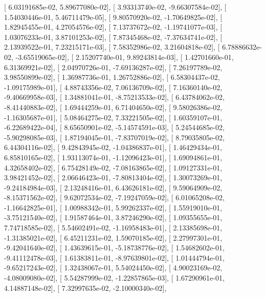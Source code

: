 \documentclass{article}
\begin{document}
       [  6.03191685e-02,   5.89677080e-02],
       [  3.93313740e-02,  -9.66307584e-02],
       [  1.54030446e-01,   5.46711479e-05],
       [  9.80570920e-02,  -1.70649825e-02],
       [  1.82945455e-01,   4.27054576e-02],
       [  7.13737672e-02,  -1.19741077e-03],
       [  1.03076233e-01,   3.87101253e-02],
       [  7.87345468e-02,  -7.37634741e-02],
       [  2.13939522e-01,   7.23215171e-03],
       [  7.58352986e-02,   3.21604818e-02],
       [  6.78886632e-02,  -3.65519065e-02],
       [  2.15207740e-01,   9.89243814e-03],
       [  1.42701660e-01,   6.31369921e-02],
       [  2.04970726e-01,  -7.69136287e-02],
       [  7.26197789e-02,   3.98550899e-02],
       [  1.36987736e-01,   1.26752886e-02],
       [  6.58304437e-02,  -1.09175989e-01],
       [  4.88743356e-02,   7.06136709e-02],
       [  7.16360140e-02,  -9.40669958e-03],
       [  1.34881041e-01,  -8.75213533e-02],
       [  6.43784062e-02,  -8.41440883e-02],
       [  1.69444259e-01,   6.71404650e-02],
       [  9.58026386e-02,  -1.16305687e-01],
       [  5.08464275e-02,   7.33221505e-02],
       [  1.60359107e-01,  -6.22689422e-04],
       [  8.65650901e-02,  -5.14574591e-03],
       [  5.24544685e-02,  -5.90298085e-03],
       [  1.87194045e-01,  -7.83707019e-02],
       [  8.79035805e-02,   6.44304116e-02],
       [  9.42843945e-02,  -1.04386837e-01],
       [  1.46429434e-01,   6.85810165e-02],
       [  1.93113074e-01,  -1.12096423e-01],
       [  1.69094861e-01,   4.32658402e-02],
       [  6.75428149e-02,  -7.08163865e-02],
       [  1.09127331e-01,   3.98421452e-02],
       [  2.06646423e-01,  -7.80813404e-02],
       [  1.30073269e-01,  -9.24184984e-03],
       [  2.13248416e-01,   6.43626181e-02],
       [  9.59064909e-02,  -8.15371562e-02],
       [  9.62072534e-02,  -7.19247059e-02],
       [  6.01065208e-02,  -1.16642825e-01],
       [  1.00988342e-01,   5.99262337e-02],
       [  1.55919010e-01,  -3.75121540e-02],
       [  1.91587464e-01,   3.87246290e-02],
       [  1.09355655e-01,   7.74718585e-02],
       [  5.54602491e-02,  -1.16958483e-01],
       [  2.13385698e-01,  -1.31385021e-02],
       [  6.45211231e-02,   1.59070185e-02],
       [  2.27997301e-01,  -9.42041640e-02],
       [  1.43639615e-01,  -5.18738776e-02],
       [  1.54682602e-01,  -9.41112478e-03],
       [  1.61383811e-01,  -8.97639801e-02],
       [  1.01444794e-01,  -9.65217243e-02],
       [  1.32438067e-01,   5.54024450e-02],
       [  4.90023169e-02,  -4.08009080e-02],
       [  5.54287999e-02,  -1.22857865e-03],
       [  1.67290961e-01,   4.14887148e-02],
       [  7.32997635e-02,  -2.10000340e-02],
\end{document}
